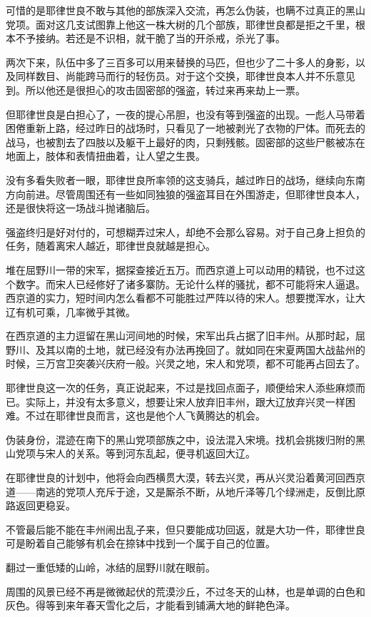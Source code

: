 可惜的是耶律世良不敢与其他的部族深入交流，再怎么伪装，也瞒不过真正的黑山党项。面对这几支试图靠上他这一株大树的几个部族，耶律世良都是拒之千里，根本不予接纳。若还是不识相，就干脆了当的开杀戒，杀光了事。

两次下来，队伍中多了三百多可以用来替换的马匹，但也少了二十多人的身影，以及同样数目、尚能跨马而行的轻伤员。对于这个交换，耶律世良本人并不乐意见到。所以他还是很担心的攻击固密部的强盗，转过来再来劫上一票。

但耶律世良是白担心了，一夜的提心吊胆，也没有等到强盗的出现。一彪人马带着困倦重新上路，经过昨日的战场时，只看见了一地被剥光了衣物的尸体。而死去的战马，也被割去了四肢以及躯干上最好的肉，只剩残骸。固密部的这些尸骸被冻在地面上，肢体和表情扭曲着，让人望之生畏。

没有多看失败者一眼，耶律世良所率领的这支骑兵，越过昨日的战场，继续向东南方向前进。尽管周围还有一些如同独狼的强盗耳目在外围游走，但耶律世良本人，还是很快将这一场战斗抛诸脑后。

强盗终归是好对付的，可想糊弄过宋人，却绝不会那么容易。对于自己身上担负的任务，随着离宋人越近，耶律世良就越是担心。

堆在屈野川一带的宋军，据探查接近五万。而西京道上可以动用的精锐，也不过这个数字。而宋人已经修好了诸多寨防。无论什么样的骚扰，都不可能将宋人逼退。西京道的实力，短时间内怎么看都不可能胜过严阵以待的宋人。想要搅浑水，让大辽有机可乘，几率微乎其微。

在西京道的主力逗留在黑山河间地的时候，宋军出兵占据了旧丰州。从那时起，屈野川、及其以南的土地，就已经没有办法再挽回了。就如同在宋夏两国大战盐州的时候，三万宫卫突袭兴庆府一般。兴灵之地，宋人和党项，都不可能再占回去了。

耶律世良这一次的任务，真正说起来，不过是找回点面子，顺便给宋人添些麻烦而已。实际上，并没有太多意义，想要让宋人放弃旧丰州，跟大辽放弃兴灵一样困难。不过在耶律世良而言，这也是他个人飞黄腾达的机会。

伪装身份，混迹在南下的黑山党项部族之中，设法混入宋境。找机会挑拨归附的黑山党项与宋人的关系。等到河东乱起，便寻机返回大辽。

在耶律世良的计划中，他将会向西横贯大漠，转去兴灵，再从兴灵沿着黄河回西京道——南逃的党项人充斥于途，又是厮杀不断，从地斤泽等几个绿洲走，反倒比原路返回更稳妥。

不管最后能不能在丰州闹出乱子来，但只要能成功回返，就是大功一件，耶律世良可是盼着自己能够有机会在捺钵中找到一个属于自己的位置。

翻过一重低矮的山岭，冰结的屈野川就在眼前。

周围的风景已经不再是微微起伏的荒漠沙丘，不过冬天的山林，也是单调的白色和灰色。得等到来年春天雪化之后，才能看到铺满大地的鲜艳色泽。


